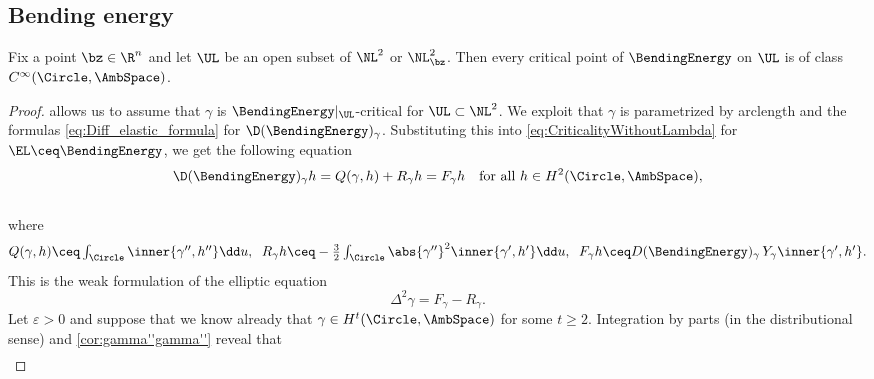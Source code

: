 \subsection{Bending energy}\label{sec:RegularityBending}

\begin{theorem}
\label{thm:elastic-smoothness-new}
Fix a point $\bz\in\R^n$ and let $\UL$ be an open subset of $\NL^2$ or $\NL^2_\bz$.
Then every critical point of $\BendingEnergy$ on $\UL$ is of class $C^\infty(\Circle,\AmbSpace)$.
\end{theorem}
\begin{proof} allows us to assume that $ \gamma $ is $ \BendingEnergy\vert_{\UL} $-critical for $ \UL\subset \NL^2$. 
    We exploit that $\gamma$ is parametrized by arclength and the formulas \cref{eq:Diff_elastic_formula}
    for $\D(\BendingEnergy)_\gamma$.
    Substituting this into \cref{eq:CriticalityWithoutLambda} for $ \EL\ceq\BendingEnergy $, we get the following equation
    \begin{equation*}
        \D(\BendingEnergy)_\gamma h
        =
        Q(\gamma,h)
        +
        R_\gamma h
        =
        F_\gamma  h
        \quad 
        \text{for all $h \in H^2(\Circle,\AmbSpace)$}
        ,
    \end{equation*}
    \\[-5ex]
    where
    \begin{equation*}
        Q(\gamma,h)
        \ceq 
        \textstyle \int_{\Circle} \inner{\gamma'',h''} \dd u
        ,
        \;\;
        R_\gamma  h
        \ceq
        \textstyle
        - \tfrac{3}{2} \int_{\Circle} \abs{\gamma''}^2 \inner{\gamma',h'} \dd u
        ,
        \;\;
        F_\gamma  h       
        \ceq 
        D(\BendingEnergy)_\gamma \, Y_\gamma \inner{\gamma',h'}
        .
    \end{equation*}
    This is the weak formulation of the elliptic equation 
    \begin{equation}
        \Delta^2 \gamma = F_\gamma - R_\gamma.
        \label{eq:Bending:EllipticEquation}
    \end{equation}
    Let $\varepsilon >0$ and suppose that we know already that $\gamma \in H^t(\Circle,\AmbSpace)$ for some $t \geq 2$.
    Integration by parts (in the distributional sense) and \cref{cor:gamma''gamma''} reveal that 
    \begin{equation}\label{eq:95A_vdM}
    \begin{aligned}

\end{aligned}
\end{equation}
\end{proof}
